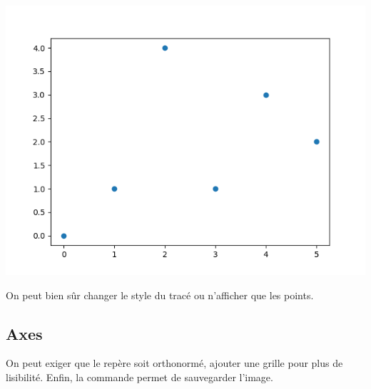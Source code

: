 \documentclass[11pt,class=report,crop=false]{standalone}
\begin{document}
\begin{minipage}{0.32\textwidth}
\begin{center}
\includegraphics[scale=\myscale,scale=0.35]{figures/pythonx-plot3}
\scriptsize {}
\end{center}
\end{minipage}

\bigskip

On peut bien sûr changer le style du tracé ou n'afficher que les points.


\subsection{Axes}

On peut exiger que le repère soit orthonormé, ajouter une grille pour plus de lisibilité.
Enfin, la commande  permet de sauvegarder l'image.
\end{document}
